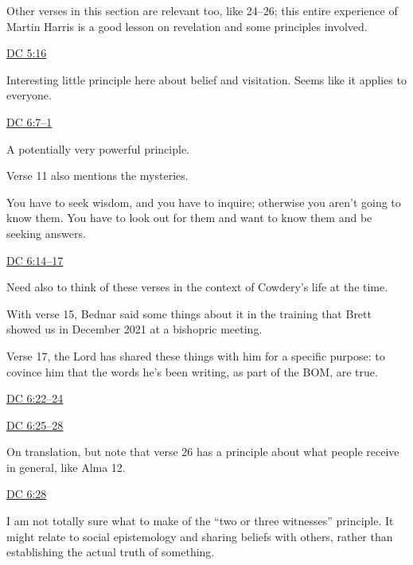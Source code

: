 \begin{compactdesc}
\begin{compactitem}
					\item Other verses in this section are relevant too, like 24--26; this entire experience of Martin Harris is a good lesson on revelation and some principles involved.
				\end{compactitem}
			\item \hyperref[DC5-16]{DC 5:16}
				\begin{compactitem}
					\item Interesting little principle here about belief and visitation. Seems like it applies to everyone.
				\end{compactitem}
			\item \hyperref[DC6-7]{DC 6:7--1}
				\begin{compactitem}
					\item A potentially very powerful principle.
					\item Verse 11 also mentions the mysteries.
					\item You have to seek wisdom, and you have to inquire; otherwise you aren't going to know them. You have to look out for them and want to know them and be seeking answers.
				\end{compactitem}
			\item \hyperref[DC6-14]{DC 6:14--17}
				\begin{compactitem}
					\item Need also to think of these verses in the context of Cowdery's life at the time.
					\item With verse 15, Bednar said some things about it in the training that Brett showed us in December 2021 at a bishopric meeting. 
					\item Verse 17, the Lord has shared these things with him for a specific purpose: to covince him that the words he's been writing, as part of the BOM, are true.
				\end{compactitem}
			\item \hyperref[DC6-22]{DC 6:22--24}
			\item \hyperref[DC6-22]{DC 6:25--28}
				\begin{compactitem}
					\item On translation, but note that verse 26 has a principle about what people receive in general, like Alma 12.
				\end{compactitem}
			\item \hyperref[DC6-28]{DC 6:28}
				\begin{compactitem}
					\item I am not totally sure what to make of the ``two or three witnesses'' principle. It might relate to social epistemology and sharing beliefs with others, rather than establishing the actual truth of something.

\end{compactitem}
\end{compactdesc}
